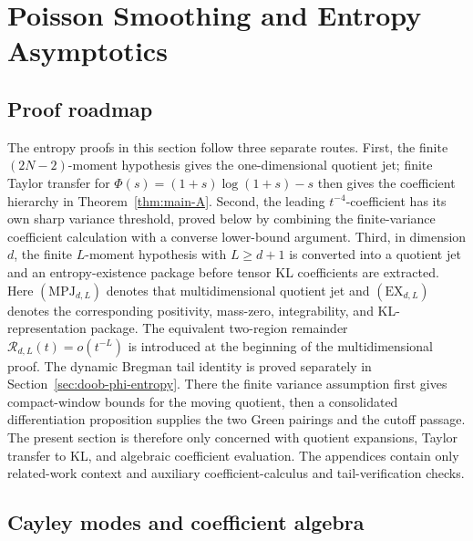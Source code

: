\section{Poisson Smoothing and Entropy Asymptotics}%
\label{sec:entropy-asymptotics}

\subsection*{Proof roadmap}
\label{sec:entropy-theorem-map}
\label{subsec:intro-hypotheses-scope}

The entropy proofs in this section follow three separate routes.  First, the finite
\((2N-2)\)-moment hypothesis gives the one-dimensional quotient jet; finite
Taylor transfer for \(\Phi(s)=(1+s)\log(1+s)-s\) then gives the coefficient
hierarchy in Theorem~\ref{thm:main-A}.  Second, the leading
\(t^{-4}\)-coefficient has its own sharp variance threshold, proved below by
combining the finite-variance coefficient calculation with a converse
lower-bound argument.  Third, in dimension \(d\), the finite
\(L\)-moment hypothesis with \(L\ge d+1\) is converted into a quotient jet and
an entropy-existence package before tensor KL coefficients are extracted.
Here \((\mathrm{MPJ}_{d,L})\) denotes that multidimensional quotient jet and
\((\mathrm{EX}_{d,L})\) denotes the corresponding positivity, mass-zero,
integrability, and KL-representation package.  The equivalent two-region
remainder \(\mathcal R_{d,L}(t)=o(t^{-L})\) is introduced at the beginning of
the multidimensional proof.
The dynamic Bregman tail identity is proved separately in
Section~\ref{sec:doob-phi-entropy}.  There the finite variance assumption
first gives compact-window bounds for the moving quotient, then a consolidated
differentiation proposition supplies the two Green pairings and the cutoff
passage.  The present section is therefore only concerned with quotient
expansions, Taylor transfer to KL, and algebraic coefficient evaluation.
The appendices contain only related-work context and auxiliary
coefficient-calculus and tail-verification checks.

\subsection{Cayley modes and coefficient algebra}

